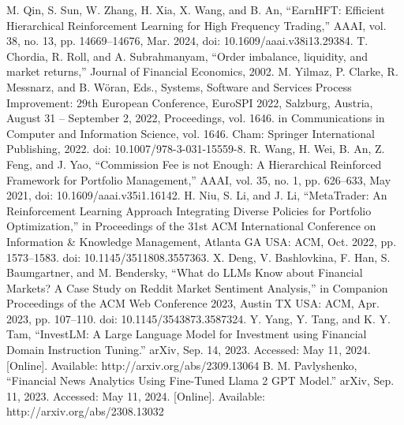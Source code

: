 \documentclass[conference]{IEEEtran}
\begin{document}
\begin{thebibliography}{00}
 M. Qin, S. Sun, W. Zhang, H. Xia, X. Wang, and B. An, “EarnHFT: Efficient Hierarchical Reinforcement Learning for High Frequency Trading,” AAAI, vol. 38, no. 13, pp. 14669–14676, Mar. 2024, doi: 10.1609/aaai.v38i13.29384.
 T. Chordia, R. Roll, and A. Subrahmanyam, “Order imbalance, liquidity, and market returns,” Journal of Financial Economics, 2002.
 M. Yilmaz, P. Clarke, R. Messnarz, and B. Wöran, Eds., Systems, Software and Services Process Improvement: 29th European Conference, EuroSPI 2022, Salzburg, Austria, August 31 – September 2, 2022, Proceedings, vol. 1646. in Communications in Computer and Information Science, vol. 1646. Cham: Springer International Publishing, 2022. doi: 10.1007/978-3-031-15559-8.
 R. Wang, H. Wei, B. An, Z. Feng, and J. Yao, “Commission Fee is not Enough: A Hierarchical Reinforced Framework for Portfolio Management,” AAAI, vol. 35, no. 1, pp. 626–633, May 2021, doi: 10.1609/aaai.v35i1.16142.
 H. Niu, S. Li, and J. Li, “MetaTrader: An Reinforcement Learning Approach Integrating Diverse Policies for Portfolio Optimization,” in Proceedings of the 31st ACM International Conference on Information \& Knowledge Management, Atlanta GA USA: ACM, Oct. 2022, pp. 1573–1583. doi: 10.1145/3511808.3557363.
 X. Deng, V. Bashlovkina, F. Han, S. Baumgartner, and M. Bendersky, “What do LLMs Know about Financial Markets? A Case Study on Reddit Market Sentiment Analysis,” in Companion Proceedings of the ACM Web Conference 2023, Austin TX USA: ACM, Apr. 2023, pp. 107–110. doi: 10.1145/3543873.3587324.
 Y. Yang, Y. Tang, and K. Y. Tam, “InvestLM: A Large Language Model for Investment using Financial Domain Instruction Tuning.” arXiv, Sep. 14, 2023. Accessed: May 11, 2024. [Online]. Available: http://arxiv.org/abs/2309.13064
 B. M. Pavlyshenko, “Financial News Analytics Using Fine-Tuned Llama 2 GPT Model.” arXiv, Sep. 11, 2023. Accessed: May 11, 2024. [Online]. Available: http://arxiv.org/abs/2308.13032
\end{thebibliography}
\end{document}

